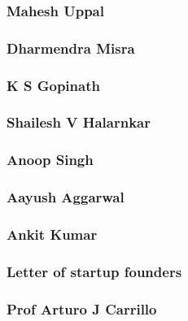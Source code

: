 \documentclass{article}
\begin{document}
\subsubsection{Mahesh Uppal}


\subsubsection{Dharmendra Misra}


\subsubsection{K S Gopinath}


\subsubsection{Shailesh V Halarnkar}


\subsubsection{Anoop Singh}


\subsubsection{Aayush Aggarwal}


\subsubsection{Ankit Kumar}


\subsubsection{Letter of startup founders}


\subsubsection{Prof Arturo J Carrillo}

\end{document}
